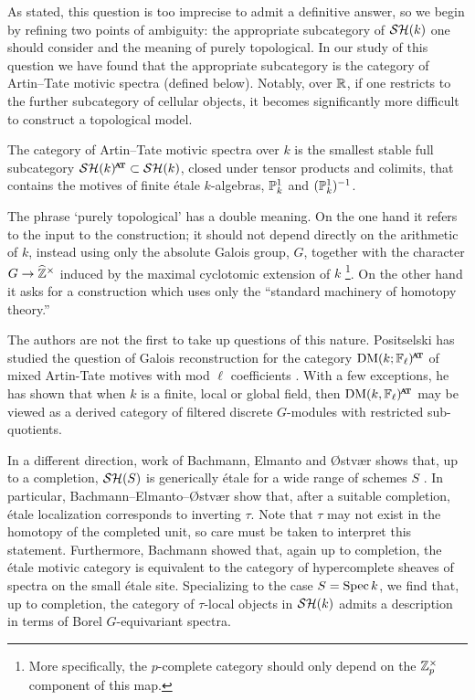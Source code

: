 As stated, this question is too imprecise to admit a definitive answer, so we begin by refining two points of ambiguity: the appropriate subcategory of $\SHk$ one should consider and the meaning of purely topological. In our study of this question we have found that the appropriate subcategory is the category of Artin--Tate motivic spectra (defined below). Notably, over $\R$, if one restricts to the further subcategory of cellular objects, it becomes significantly more difficult to construct a topological model.

\begin{dfn}
  The category of Artin--Tate motivic spectra over $k$ is the smallest stable full subcategory
  $\SHkat \subset \SHk$,
  closed under tensor products and colimits, that contains the motives of finite \'etale $k$-algebras, 
  $\P_k^1$ and $(\P_k^1)^{-1}$.
\end{dfn}

The phrase `purely topological' has a double meaning.
On the one hand it refers to the input to the construction;
it should not depend directly on the arithmetic of $k$, instead using only the absolute Galois group, $G$, together with the character $G \to \widehat{\Z}^\times$ induced by the maximal cyclotomic extension of $k$ \footnote{More specifically, the $p$-complete category should only depend on the $\Z_p^\times$ component of this map.}.
On the other hand it asks for a construction which uses only the ``standard machinery of homotopy theory.''

The authors are not the first to take up questions of this nature.
Positselski has studied the question of Galois reconstruction for the category $\DM(k;\F_\ell)^{\at}$ of mixed Artin-Tate motives with mod $\ell$ coefficients \cite{DMRecon,GalKosz}. With a few exceptions, he has shown that when $k$ is a finite, local or global field, then $\DM(k,\F_\ell)^{\at}$ may be viewed as a derived category of filtered discrete $G$-modules with restricted sub-quotients. %

In a different direction, work of Bachmann, Elmanto and {\O}stv{\ae}r shows that, up to a completion, $\SH(S)$ is generically \'etale for a wide range of schemes $S$ \cite{TomEtaleI, TomEtaleII}. In particular, Bachmann--Elmanto--{\O}stv{\ae}r show that, after a suitable completion, \'etale localization corresponds to inverting $\tau$. Note that $\tau$ may not exist in the homotopy of the completed unit, so care must be taken to interpret this statement.
Furthermore, Bachmann showed that, again up to completion, the \'etale motivic category is equivalent to the category of hypercomplete sheaves of spectra on the small \'etale site.
Specializing to the case $S = \Spec k$, we find that, up to completion, the category of $\tau$-local objects in $\SH(k)$ admits a description in terms of Borel $G$-equivariant spectra.

